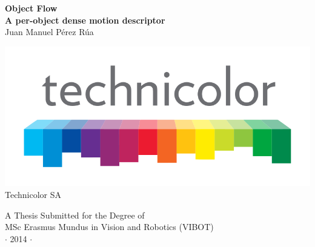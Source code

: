 
\newpage
\thispagestyle{empty}


\vspace*{1cm}
\begin{center}
{\huge\bf Object Flow\\}
{\large\bf A per-object dense motion descriptor\\}
\vspace{2cm} 
{\large Juan Manuel P\'erez R\'ua\\}
\vspace{1cm} 

\includegraphics[height=0.25\textheight]{images/logo/technicolor_large.png} \\

\vspace{2cm} 
\normalsize{Technicolor SA \\}%
\end{center}

\vspace{2cm}
\begin{center}
{\large A Thesis Submitted for the Degree of \\MSc Erasmus Mundus
in Vision and Robotics (VIBOT) \\\vspace{0.3cm} $\cdot$ 2014
$\cdot$}
\end{center}
\singlespacing
